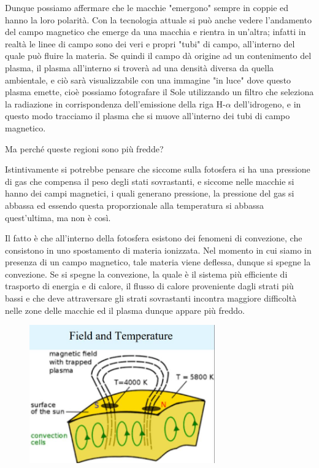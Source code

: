 Dunque possiamo affermare che le macchie "emergono" sempre in coppie ed hanno la loro polarità. Con la tecnologia attuale si può anche vedere l'andamento del campo magnetico che emerge da una macchia e rientra in un'altra; infatti in realtà le linee di campo sono dei veri e propri "tubi" di campo, all'interno del quale può fluire la materia. Se quindi il campo dà origine ad un contenimento del plasma, il plasma all'interno si troverà ad una densità diversa da quella ambientale, e ciò sarà visualizzabile con una immagine "in luce" dove questo plasma emette, cioè possiamo fotografare il Sole utilizzando un filtro che seleziona la radiazione in corrispondenza dell'emissione della riga H-$\alpha$ dell'idrogeno, e in questo modo tracciamo il plasma che si muove all'interno dei tubi di campo magnetico.

Ma perché queste regioni sono più fredde?

Istintivamente si potrebbe pensare che siccome sulla fotosfera si ha una pressione di gas che compensa il peso degli stati sovrastanti, e siccome nelle macchie si hanno dei campi magnetici, i quali generano pressione, la pressione del gas si abbassa ed essendo questa proporzionale alla temperatura si abbassa quest'ultima, ma non è così.

Il fatto è che all'interno della fotosfera esistono dei fenomeni di convezione, che consistono in uno spostamento di materia ionizzata. Nel momento in cui siamo in presenza di un campo magnetico, tale materia viene deflessa, dunque si spegne la convezione. Se si spegne la convezione, la quale è il sistema più efficiente di trasporto di energia e di calore, il flusso di calore proveniente dagli strati più bassi e che deve attraversare gli strati sovrastanti incontra maggiore difficoltà nelle zone delle macchie ed il plasma dunque appare più freddo.

\begin{figure}[H]
    \centering
    \includegraphics[width=8cm]{2dic/ConvezioneMacchie.jpg}
    \label{fig:Convezione}
\end{figure}

